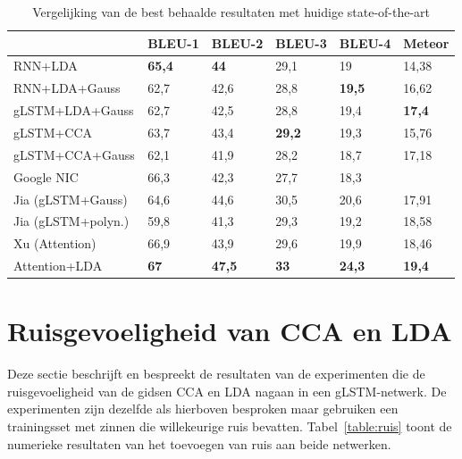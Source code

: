 \begin{table}
	\centering
	\begin{tabular}{llllll}
		~                  & BLEU-1 & BLEU-2 & BLEU-3 & BLEU-4 & Meteor \\ \hline
		RNN+LDA            & \textbf{65,4}   & \textbf{44}     & 29,1   & 19     & 14,38  \\
		RNN+LDA+Gauss      & 62,7   & 42,6   & 28,8   & \textbf{19,5}   & 16,62  \\
		gLSTM+LDA+Gauss    & 62,7   & 42,5   & 28,8   & 19,4   & \textbf{17,4}   \\
		gLSTM+CCA          & 63,7   & 43,4   & \textbf{29,2}   & 19,3   & 15,76  \\
		gLSTM+CCA+Gauss    & 62,1   & 41,9   & 28,2   & 18,7   & 17,18  \\ \hline
		
		Google NIC~\cite{Google}           & 66,3   & 42,3   & 27,7   & 18,3   & ~      \\
		Jia (gLSTM+Gauss)~\cite{Fernando2015}  & 64,6   & 44,6   & 30,5   & 20,6   & 17,91  \\
		Jia (gLSTM+polyn.)~\cite{Fernando2015} & 59,8   & 41,3   & 29,3   & 19,2   & 18,58  \\
		Xu (Attention)~\cite{Xu2015}     & 66,9   & 43,9   & 29,6   & 19,9   & 18,46  \\
		Attention+LDA~\cite{Jin2015}      & \textbf{67}    & \textbf{47,5}   & \textbf{33}     & \textbf{24,3}   & \textbf{19,4}   \\ \hline
	\end{tabular}
	\caption{Vergelijking van de best behaalde resultaten met huidige state-of-the-art}
	\label{table:sota}
\end{table}

\section{Ruisgevoeligheid van CCA en LDA} %
\label{sec:ruisgevoeligheid_van_cca_en_lda_res}
Deze sectie beschrijft en bespreekt de resultaten van de experimenten die de ruisgevoeligheid van de gidsen CCA en LDA nagaan in een gLSTM-netwerk.
De experimenten zijn dezelfde als hierboven besproken maar gebruiken een trainingsset met zinnen die willekeurige ruis bevatten.
Tabel~\ref{table:ruis} toont de numerieke resultaten van het toevoegen van ruis aan beide netwerken.

